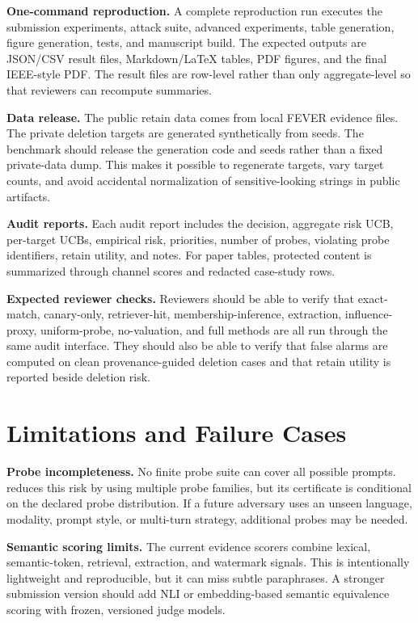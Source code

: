 \textbf{One-command reproduction.}
A complete reproduction run executes the submission experiments, attack suite, advanced experiments, table generation, figure generation, tests, and manuscript build. The expected outputs are JSON/CSV result files, Markdown/LaTeX tables, PDF figures, and the final IEEE-style PDF. The result files are row-level rather than only aggregate-level so that reviewers can recompute summaries.

\textbf{Data release.}
The public retain data comes from local FEVER evidence files. The private deletion targets are generated synthetically from seeds. The benchmark should release the generation code and seeds rather than a fixed private-data dump. This makes it possible to regenerate targets, vary target counts, and avoid accidental normalization of sensitive-looking strings in public artifacts.

\textbf{Audit reports.}
Each audit report includes the decision, aggregate risk UCB, per-target UCBs, empirical risk, priorities, number of probes, violating probe identifiers, retain utility, and notes. For paper tables, protected content is summarized through channel scores and redacted case-study rows.

\textbf{Expected reviewer checks.}
Reviewers should be able to verify that exact-match, canary-only, retriever-hit, membership-inference, extraction, influence-proxy, uniform-probe, no-valuation, and full \method{} methods are all run through the same audit interface. They should also be able to verify that false alarms are computed on clean provenance-guided deletion cases and that retain utility is reported beside deletion risk.

\section{Limitations and Failure Cases}

\textbf{Probe incompleteness.}
No finite probe suite can cover all possible prompts. \method{} reduces this risk by using multiple probe families, but its certificate is conditional on the declared probe distribution. If a future adversary uses an unseen language, modality, prompt style, or multi-turn strategy, additional probes may be needed.

\textbf{Semantic scoring limits.}
The current evidence scorers combine lexical, semantic-token, retrieval, extraction, and watermark signals. This is intentionally lightweight and reproducible, but it can miss subtle paraphrases. A stronger submission version should add NLI or embedding-based semantic equivalence scoring with frozen, versioned judge models.

